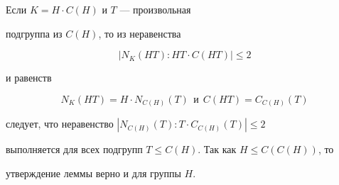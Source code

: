 \begin{pf}


Если $K=H \cdot C(H)$ и $T$ --- произвольная 


подгруппа из $C(H)$, то из неравенства


$$


|N_K(HT):HT\cdot C(HT)|\le 2


$$


и равенств


$$


N_K(HT)=H\cdot N_{C(H)}(T)\ \ \text{и}\ \ C(HT)=C_{C(H)}(T)


$$


следует, что неравенство $|N_{C(H)}(T):T \cdot C_{C(H)}(T)|\le 2$


выполняется для всех подгрупп $T\le C(H)$. Так как $H\le C(C(H))$, то


утверждение леммы верно и для группы $H$.


\end{pf}





